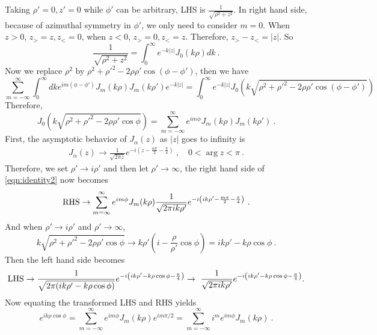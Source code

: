 \documentclass[12pt]{article}
\begin{document}
Taking $\rho' = 0, z' = 0$ while $\phi'$ can be arbitrary,
LHS is $\frac{1}{\sqrt{\rho^2 + z^2}}$. In right hand side, because of azimuthal symmetry in $\phi'$, we only need to consider $m=0$. When $z > 0$, $z_> = z, z_< = 0$, when $z<0$, $z_> = 0, z_< = z$. Therefore, $z_> - z_< = |z|$. So
\begin{equation}
    \frac{1}{\sqrt{\rho^2 + z^2}} = \int_0^\infty e^{-k|z|} J_0(k \rho) dk~.
\end{equation}
Now we replace $\rho^2$ by $\rho^2 + \rho'^2 - 2\rho \rho' \cos(\phi - \phi')$, then we have
\begin{equation}
    \sum_{m = -\infty}^\infty \int_0^\infty dk e^{im(\phi - \phi')} J_m(k \rho) J_m(k \rho') e^{-k|z|} = \int_0^\infty e^{-k|z|} J_0(k \sqrt{\rho^2 + \rho'^2 - 2\rho \rho' \cos (\phi - \phi')})
\end{equation}
Therefore,
\begin{equation}\label{eqn:identity2}
    J_0(k \sqrt{\rho^2 + \rho'^2 - 2\rho \rho' \cos\phi}) = \sum_{m=-\infty}^\infty e^{im \phi} J_m(k \rho) J_m(k \rho')~.
\end{equation}
First, the asymptotic behavior of $J_\alpha(z)$ as $|z|$ goes to infinity is
\begin{align}
    J_\alpha(z) \to \frac{1}{\sqrt{2\pi z}} e^{-i\left(z - \frac{\alpha\pi}{2} - \frac{\pi}{4}\right)}~, \quad 0 <\arg z <\pi~.
\end{align}
Therefore, we set $\rho' \to i \rho'$ and then let $\rho' \to \infty$, the right hand side of \eqref{eqn:identity2} now becomes
\begin{equation}
    {\rm RHS} \to \sum_{m = \infty}^\infty e^{im \phi} J_m(k \rho)
    \frac{1}{\sqrt{2\pi i k \rho'}} e^{-i\left(ik\rho' - \frac{m \pi}{2} - \frac{\pi}{4}\right)}~.
\end{equation}
And when $\rho' \to i \rho'$ and $\rho' \to \infty$,
\begin{equation}
    k \sqrt{\rho^2 + \rho'^2 - 2\rho \rho' \cos \phi} \to k\rho'\left(i - \frac{\rho}{\rho'} \cos \phi\right) = i k \rho' - k \rho \cos\phi~.
\end{equation}
Then the left hand side becomes
\begin{equation}
    {\rm LHS} \to \frac{1}{\sqrt{2\pi (i k \rho' - k \rho \cos \phi)}} e^{-i\left(ik\rho' - k \rho \cos \phi - \frac{\pi}{4}\right)} \to ~ \frac{1}{\sqrt{2\pi i k \rho'}} e^{-i\left(ik\rho' - k \rho \cos \phi - \frac{\pi}{4}\right)} .
\end{equation}
Now equating the transformed LHS and RHS yields
\begin{equation}
    e^{i k \rho \cos \phi} =\sum_{m = -\infty}^\infty e^{im \phi} J_m(k \rho) e^{im\pi /2}= \sum_{m = -\infty}^\infty i^m e^{im \phi} J_m(k \rho)~.
\end{equation}
\end{document}
